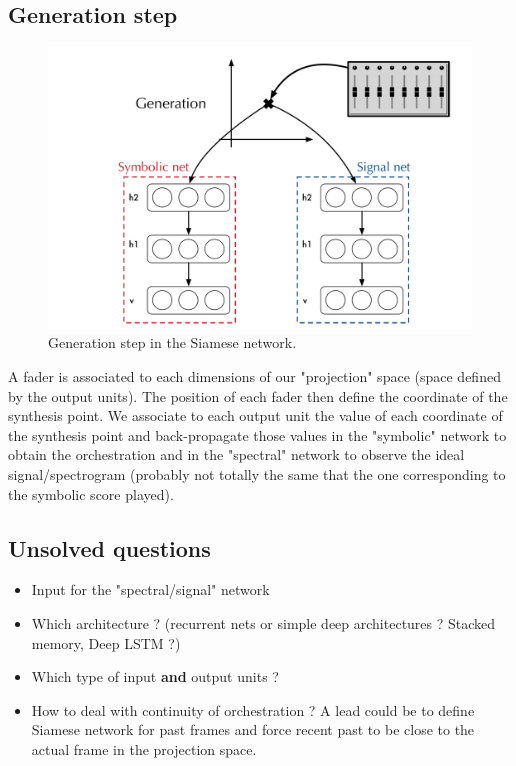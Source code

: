 \documentclass{report}
\begin{document}
\subsection{Generation step}
\begin{figure}
\centering
\includegraphics[width=0.97\linewidth]{Ideas/Siamese_net/siamese_net_generation}
\caption{Generation step in the Siamese network.}
\end{figure}
A fader is associated to each dimensions of our "projection" space (space defined by the output units). The position of each fader then define the coordinate of the synthesis point. We associate to each output unit the value of each coordinate of the synthesis point and back-propagate those values in the "symbolic" network to obtain the orchestration and in the "spectral" network to observe the ideal signal/spectrogram (probably not totally the same that the one corresponding to the symbolic score played).

\subsection{Unsolved questions}
\begin{itemize}
\item Input for the "spectral/signal" network
\item Which architecture ? (recurrent nets or simple deep architectures ? Stacked memory, Deep LSTM ?)
\item Which type of input \textbf{and} output units ?
\item How to deal with continuity of orchestration ? A lead could be to define Siamese network for past frames and force recent past to be close to the actual frame in the projection space.
\end{itemize}
\end{document}
